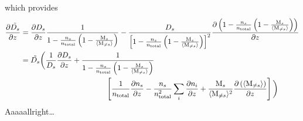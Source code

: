 which provides
\begin{equation}
\begin{split}
\doverd{\tilde{\diff_s}}{z} & = \doverd{\diff_s}{z}\frac{1}{1-\frac{\conc_s}{\concAtm}\left(1 - \frac{\Mm_s}{\mean{\Mm_{\neq s}}}\right)}
                              - \frac{\diff_s}{\left[1-\frac{\conc_s}{\concAtm}\left(1 - \frac{\Mm_s}{\mean{\Mm_{\neq s}}}\right)\right]^2}
                                \dOverd{1-\frac{\conc_s}{\concAtm}\left(1 - \frac{\Mm_s}{\mean{\Mm_{\neq s}}}\right)}{z}\\
                            & = \tilde{\diff_s}\bigg(\frac{1}{\diff_s}\doverd{\diff_s}{z}
                              + 
                                   \frac{1}{1-\frac{\conc_s}{\concAtm}  \left(1 - \frac{\Mm_s}{\mean{\Mm_{\neq s}}}\right)} \\
                              &\hspace{4cm}
                                \left[\frac{1}{\concAtm}\doverd{\conc_s}{z} - \frac{\conc_s}{\concAtm^2}\displaystyle\sum_i\doverd{\conc_i}{z} + 
                                      \frac{\Mm_s}{\mean{\Mm_{\neq s}}^2}\dOverd{\mean{\Mm_{\neq s}}}{z}\right]\bigg)
\end{split}
\end{equation}
Aaaaallright\dots
